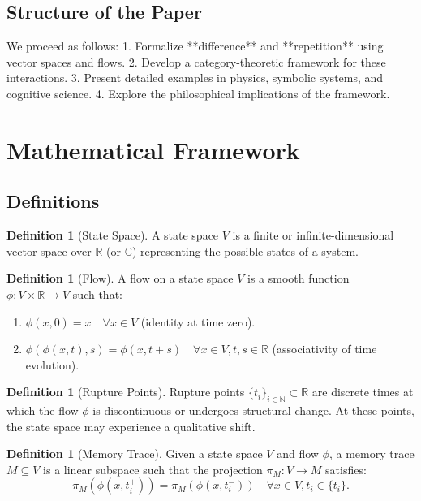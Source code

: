 \documentclass[12pt]{article}
\theoremstyle{plain}
\theoremstyle{definition}
\newtheorem{definition}[theorem]{Definition}
\begin{document}
\subsection{Structure of the Paper}

We proceed as follows:
1. Formalize **difference** and **repetition** using vector spaces and flows.
2. Develop a category-theoretic framework for these interactions.
3. Present detailed examples in physics, symbolic systems, and cognitive science.
4. Explore the philosophical implications of the framework.

\section{Mathematical Framework}

\subsection{Definitions}

\begin{definition}[State Space]
A state space \( V \) is a finite or infinite-dimensional vector space over \( \mathbb{R} \) (or \( \mathbb{C} \)) representing the possible states of a system.
\end{definition}

\begin{definition}[Flow]
A flow on a state space \( V \) is a smooth function \( \phi: V \times \mathbb{R} \to V \) such that:
\begin{enumerate}
    \item \(\phi(x, 0) = x \quad \forall x \in V\) (identity at time zero).
    \item \(\phi(\phi(x, t), s) = \phi(x, t + s) \quad \forall x \in V, t, s \in \mathbb{R}\) (associativity of time evolution).
\end{enumerate}
\end{definition}

\begin{definition}[Rupture Points]
Rupture points \( \{t_i\}_{i \in \mathbb{N}} \subset \mathbb{R} \) are discrete times at which the flow \( \phi \) is discontinuous or undergoes structural change. At these points, the state space may experience a qualitative shift.
\end{definition}

\begin{definition}[Memory Trace]
Given a state space \( V \) and flow \( \phi \), a memory trace \( M \subseteq V \) is a linear subspace such that the projection \( \pi_M: V \to M \) satisfies:
\[
\pi_M(\phi(x, t_i^+)) = \pi_M(\phi(x, t_i^-)) \quad \forall x \in V, t_i \in \{t_i\}.
\]
\end{definition}
\end{document}

